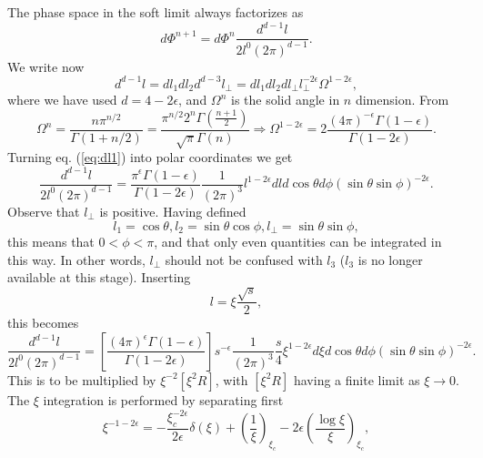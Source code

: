 \documentclass{letter}
\begin{document}
The phase space in the soft limit always factorizes as
\begin{equation}
  d \Phi^{n + 1} = d \Phi^n \frac{d^{d - 1} l}{2 l^0 (2 \pi)^{d - 1}} .
\end{equation}
We write now
\begin{equation}
  d^{d - 1} l = d l_1 d l_2 d^{d - 3} l_{\perp} = d l_1 d l_2 d l_{\perp}
  l_{\perp}^{- 2 \epsilon} \Omega^{1 - 2 \epsilon}, \label{eq:dl1}
\end{equation}
where we have used $d = 4 - 2 \epsilon$, and $\Omega^n$ is the solid angle in
$n$ dimension. From
\begin{equation}
  \Omega^n = \frac{n \pi^{n / 2}}{\Gamma (1 + n / 2)} = \frac{\pi^{n / 2} 2^n
  \Gamma \left( \frac{n + 1}{2} \right)}{\sqrt{\pi} \Gamma (n)}
  \Longrightarrow \Omega^{1 - 2 \epsilon} = 2 \frac{(4 \pi)^{- \epsilon}
  \Gamma \left( 1 - \epsilon \right)}{\Gamma (1 - 2 \epsilon)} .
\end{equation}
Turning eq. (\ref{eq:dl1}) into polar coordinates we get
\begin{equation}
  \frac{d^{d - 1} l}{2 l^0 (2 \pi)^{d - 1}} = \frac{\pi^{\epsilon} \Gamma
  \left( 1 - \epsilon \right)}{\Gamma (1 - 2 \epsilon)}  \frac{1}{(2 \pi)^3}
  l^{1 - 2 \epsilon} d l d \cos \theta d \phi (\sin \theta \sin \phi)^{- 2
  \epsilon} .
\end{equation}
Observe that $l_{\perp}$ is positive. Having defined
\begin{equation}
  l_1 = \cos \theta, l_2 = \sin \theta \cos \phi, l_{\perp} = \sin \theta \sin
  \phi,
\end{equation}
this means that $0 < \phi < \pi$, and that only even quantities can be
integrated in this way. In other words, $l_{\perp}$ should not be confused
with $l_3$ ($l_3$ is no longer available at this stage). Inserting
\begin{equation}
  l = \xi \frac{\sqrt{s}}{2},
\end{equation}
this becomes
\begin{equation}
  \frac{d^{d - 1} l}{2 l^0 (2 \pi)^{d - 1}} = \left[ \frac{(4 \pi)^{\epsilon}
  \Gamma \left( 1 - \epsilon \right)}{\Gamma (1 - 2 \epsilon)} \right] s^{-
  \epsilon}  \frac{1}{(2 \pi)^3}  \frac{s}{4} \xi^{1 - 2 \epsilon} d \xi d
  \cos \theta d \phi (\sin \theta \sin \phi)^{- 2 \epsilon} .
\end{equation}
This is to be multiplied by $\xi^{- 2} [\xi^2 R]$, with $[\xi^2 R]$ having a
finite limit as $\xi \rightarrow 0$. The $\xi$ integration is performed by
separating first
\begin{equation}
  \xi^{- 1 - 2 \epsilon} = - \frac{\xi_c^{- 2 \epsilon}}{2 \epsilon} \delta
  (\xi) + \left( \frac{1}{\xi} \right)_{\xi_c} - 2 \epsilon \left( \frac{\log
  \xi}{\xi} \right)_{\xi_c},
\end{equation}
\end{document}
